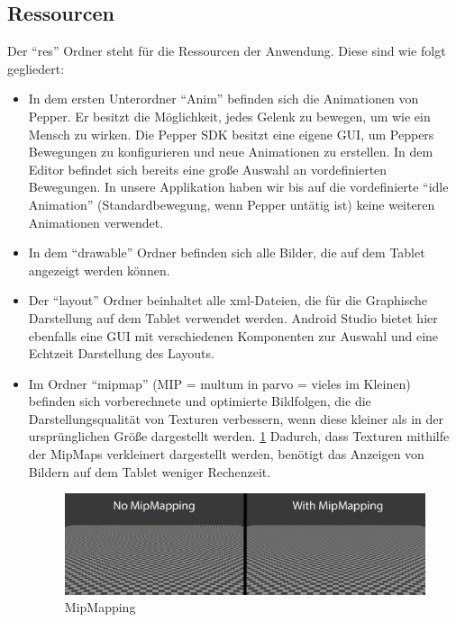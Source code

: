 \subsection{Ressourcen}
Der ``res'' Ordner steht für die Ressourcen der Anwendung. Diese sind wie folgt gegliedert:
\begin{itemize}
\item In dem ersten Unterordner ``Anim'' befinden sich die Animationen von Pepper. Er besitzt die Möglichkeit, jedes Gelenk zu bewegen, 
um wie ein Mensch zu wirken. Die Pepper SDK besitzt eine eigene GUI, um Peppers Bewegungen zu konfigurieren und neue Animationen zu erstellen. 
In dem Editor befindet sich bereits eine große Auswahl an vordefinierten Bewegungen. In unsere Applikation haben wir bis auf die vordefinierte 
``idle Animation''  (Standardbewegung, wenn Pepper untätig ist) keine weiteren Animationen verwendet. 

\item In dem ``drawable'' Ordner befinden sich alle Bilder, die auf dem Tablet angezeigt werden können.

\item Der ``layout'' Ordner beinhaltet alle xml-Dateien, die für die Graphische Darstellung auf dem Tablet verwendet werden. Android 
Studio bietet hier ebenfalls eine GUI mit verschiedenen Komponenten zur Auswahl und eine Echtzeit Darstellung des Layouts. 

\item Im Ordner ``mipmap'' (MIP = multum in parvo = vieles im Kleinen) befinden sich vorberechnete und optimierte Bildfolgen, die die 
Darstellungsqualität von Texturen verbessern, wenn diese kleiner als in der ursprünglichen Größe dargestellt werden. \ref{fig:MipMap}
Dadurch, dass Texturen mithilfe der MipMaps verkleinert dargestellt werden, benötigt das Anzeigen von Bildern auf dem Tablet weniger Rechenzeit.
\cite{MipMaps}

\begin{figure}[H]
    \includegraphics[width=\textwidth]{Figures/AppChapter/4_1_2.png}
    \caption{MipMapping}
    \label{fig:MipMap}
    \centering
\end{figure}


\end{itemize}
